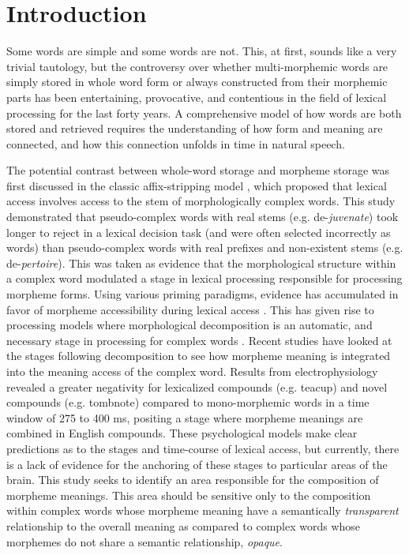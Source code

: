 \documentclass{frontiersSCNS}
\begin{document}
\section{Introduction}

	Some words are simple and some words are not. This, at first, sounds like a very trivial tautology, but the controversy over whether multi-morphemic words are simply stored in whole word form \citep*{Butterworth:1983, Giraudo:2001} or always constructed from their morphemic parts \citep*{Taft:2004} has been entertaining, provocative, and contentious in the field of lexical processing for the last forty years. A comprehensive model of how words are both stored and retrieved requires the understanding of how form and meaning are connected, and how this connection unfolds in time in natural speech. 

	The potential contrast between whole-word storage and morpheme storage was first discussed in the classic affix-stripping model \citep*{Taft:1975}, which proposed that lexical access involves access to the stem of morphologically complex words. This study demonstrated that pseudo-complex words with real stems (e.g. de-\textit{juvenate}) took longer to reject in a lexical decision task (and were often selected incorrectly as words) than pseudo-complex words with real prefixes and non-existent stems (e.g. de-\textit{pertoire}). This was taken as evidence that the morphological structure within a complex word modulated a stage in lexical processing responsible for processing morpheme forms. Using various priming paradigms, evidence has accumulated in favor of morpheme accessibility during lexical access  \citep*{Taft:2004, Marslen-Wilson:1994, Rastle:2003}. This has given rise to processing models where morphological decomposition is an automatic, and necessary stage in processing for complex words \citep*{Rastle:2004}. Recent studies \citep*{Fiorentino:2013, Semenza:2014} have looked at the stages following decomposition to see how morpheme meaning is integrated into the meaning access of the complex word. Results from electrophysiology \citep{Fiorentino:2013} revealed a greater negativity for lexicalized compounds (e.g. teacup) and novel compounds (e.g. tombnote) compared to mono-morphemic words in a time window of 275 to 400 ms, positing a stage where morpheme meanings are combined in English compounds. These psychological models make clear predictions as to the stages and time-course of lexical access, but currently, there is a lack of evidence for the anchoring of these stages to particular areas of the brain. This study seeks to identify an area responsible for the composition of morpheme meanings. This area should be sensitive only to the composition within complex words whose morpheme meaning have a semantically \textit{transparent} relationship to the overall meaning as compared to complex words whose morphemes do not share a semantic relationship, \textit{opaque}.
\end{document}
